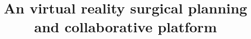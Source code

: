 \documentclass{bmcart}
\begin{document}
\begin{frontmatter}

\begin{fmbox}


\title{An virtual reality surgical planning and collaborative platform}



\end{fmbox}
\end{frontmatter}
\end{document}
